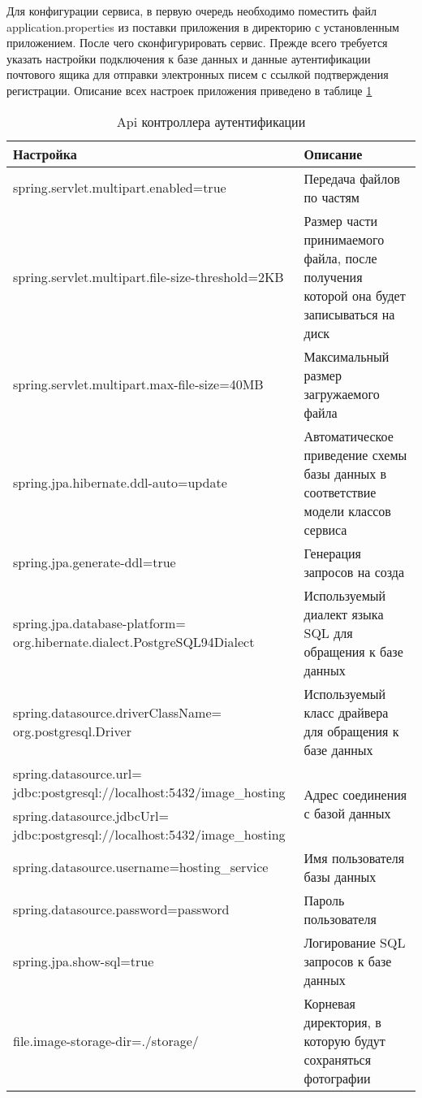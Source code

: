 Для конфигурации сервиса, в первую очередь необходимо поместить файл application.properties из поставки приложения в директорию с установленным приложением.
После чего сконфигурировать сервис.
Прежде всего требуется указать настройки подключения к базе данных и данные аутентификации почтового ящика для отправки электронных писем с ссылкой подтверждения регистрации. Описание всех настроек приложения приведено в таблице \ref{properties-table}

\begin{table}[H]
  \caption{Api контроллера аутентификации}\label{properties-table}
  \begin{tabular}{|p{9cm}|p{7cm}|}
  \hline Настройка & Описание \\
  \hline spring.servlet.multipart.enabled=true & Передача файлов по частям \\
  \hline spring.servlet.multipart.file-size-threshold=2KB & Размер части  принимаемого файла, после получения которой она будет записываться на диск \\
  \hline spring.servlet.multipart.max-file-size=40MB & Максимальный размер загружаемого файла \\
  \hline spring.jpa.hibernate.ddl-auto=update & Автоматическое приведение схемы базы данных в соответствие модели классов сервиса \\
  \hline spring.jpa.generate-ddl=true & Генерация запросов на созда \\
  \hline spring.jpa.database-platform= org.hibernate.dialect.PostgreSQL94Dialect & Используемый диалект языка SQL для обращения к базе данных \\
  \hline spring.datasource.driverClassName= org.postgresql.Driver & Используемый класс драйвера для обращения к базе данных \\
  \hline spring.datasource.url= jdbc:postgresql://localhost:5432/image_hosting & \multirow{2}{=}{Адрес соединения с базой данных} \\
  \cline{1-1} spring.datasource.jdbcUrl= jdbc:postgresql://localhost:5432/image_hosting & \\
  \hline spring.datasource.username=hosting_service & Имя пользователя базы данных\\
  \hline spring.datasource.password=password & Пароль пользователя \\
  \hline spring.jpa.show-sql=true & Логирование SQL запросов к базе данных \\
  \hline file.image-storage-dir=./storage/ & Корневая директория, в которую будут сохраняться фотографии \\
  \end{tabular}
\end{table}
